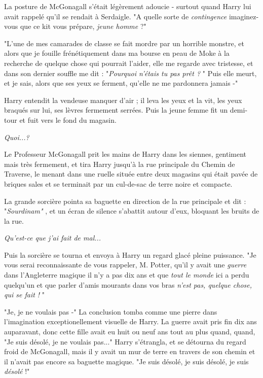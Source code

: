 La posture de McGonagall s'était légèrement adoucie - surtout quand Harry lui avait rappelé qu'il se rendait à Serdaigle. "A quelle sorte de \emph{contingence}  imaginez-vous que ce kit vous prépare, \emph{jeune homme}  ?"

"L'une de mes camarades de classe se fait mordre par un horrible monstre, et alors que je fouille frénétiquement dans ma bourse en peau de Moke à la recherche de quelque chose qui pourrait l'aider, elle me regarde avec tristesse, et dans son dernier souffle me dit : "\emph{Pourquoi n'étais tu pas prêt ?} " Puis elle meurt, et je sais, alors que ses yeux se ferment, qu'elle ne me pardonnera jamais -"

Harry entendit la vendeuse manquer d'air ; il leva les yeux et la vit, les yeux braqués sur lui, ses lèvres fermement serrées. Puis la jeune femme fit un demi-tour et fuit vers le fond du magasin.

\emph{Quoi...?} 

Le Professeur McGonagall prit les mains de Harry dans les siennes, gentiment mais très fermement, et tira Harry jusqu'à la rue principale du Chemin de Traverse, le menant dans une ruelle située entre deux magasins qui était pavée de briques sales et se terminait par un cul-de-sac de terre noire et compacte.

La grande sorcière pointa sa baguette en direction de la rue principale et dit : "\emph{Sourdinam"} , et un écran de silence s'abattit autour d'eux, bloquant les bruits de la rue.

\emph{Qu'est-ce que j'ai fait de mal...} 

Puis la sorcière se tourna et envoya à Harry un regard glacé pleine puissance. "Je vous serai reconnaissante de vous rappeler, M. Potter, qu'il y avait une \emph{guerre}  dans l'Angleterre magique il n'y a pas dix ans et que \emph{tout le monde}  ici a perdu quelqu'un et que parler d'amis mourants dans vos bras \emph{n'est pas, quelque chose, qui se fait !} "

"Je, je ne voulais pas -" La conclusion tomba comme une pierre dans l'imagination exceptionellement visuelle de Harry. La guerre avait pris fin dix ans auparavant, donc cette fille avait eu huit ou neuf ans tout au plus quand, quand, "Je suis désolé, je ne voulais pas..." Harry s'étrangla, et se détourna du regard froid de McGonagall, mais il y avait un mur de terre en travers de son chemin et il n'avait pas encore sa baguette magique. "Je suis désolé, je suis désolé, je suis \emph{désolé}  !"

